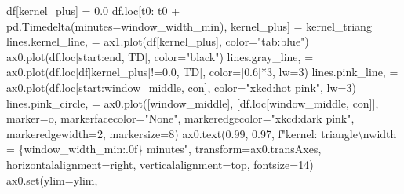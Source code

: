 \documentclass[
  letterpaper,
  DIV=11,
  numbers=noendperiod,
  oneside]{scrreprt}
\newenvironment{Shaded}{\begin{snugshade}}{\end{snugshade}}
\newcommand{\BuiltInTok}[1]{\textcolor[rgb]{0.00,0.23,0.31}{#1}}
\newcommand{\CharTok}[1]{\textcolor[rgb]{0.13,0.47,0.30}{#1}}
\newcommand{\DecValTok}[1]{\textcolor[rgb]{0.68,0.00,0.00}{#1}}
\newcommand{\FloatTok}[1]{\textcolor[rgb]{0.68,0.00,0.00}{#1}}
\newcommand{\NormalTok}[1]{\textcolor[rgb]{0.00,0.23,0.31}{#1}}
\newcommand{\OperatorTok}[1]{\textcolor[rgb]{0.37,0.37,0.37}{#1}}
\newcommand{\SpecialCharTok}[1]{\textcolor[rgb]{0.37,0.37,0.37}{#1}}
\newcommand{\SpecialStringTok}[1]{\textcolor[rgb]{0.13,0.47,0.30}{#1}}
\newcommand{\StringTok}[1]{\textcolor[rgb]{0.13,0.47,0.30}{#1}}
\begin{document}
\begin{Shaded}
\begin{Highlighting}[]
\NormalTok{df[}\StringTok{\textquotesingle{}kernel\_plus\textquotesingle{}}\NormalTok{] }\OperatorTok{=} \FloatTok{0.0}
\NormalTok{df.loc[t0: t0 }\OperatorTok{+}\NormalTok{ pd.Timedelta(minutes}\OperatorTok{=}\NormalTok{window\_width\_min), }\StringTok{\textquotesingle{}kernel\_plus\textquotesingle{}}\NormalTok{] }\OperatorTok{=}\NormalTok{ kernel\_triang}
\NormalTok{lines.kernel\_line, }\OperatorTok{=}\NormalTok{ ax1.plot(df[}\StringTok{\textquotesingle{}kernel\_plus\textquotesingle{}}\NormalTok{], color}\OperatorTok{=}\StringTok{"tab:blue"}\NormalTok{)}
\NormalTok{ax0.plot(df.loc[start:end, }\StringTok{\textquotesingle{}TD\textquotesingle{}}\NormalTok{], color}\OperatorTok{=}\StringTok{"black"}\NormalTok{)}
\NormalTok{lines.gray\_line, }\OperatorTok{=}\NormalTok{ ax0.plot(df.loc[df[}\StringTok{\textquotesingle{}kernel\_plus\textquotesingle{}}\NormalTok{]}\OperatorTok{!=}\FloatTok{0.0}\NormalTok{, }\StringTok{\textquotesingle{}TD\textquotesingle{}}\NormalTok{],}
\NormalTok{                     color}\OperatorTok{=}\NormalTok{[}\FloatTok{0.6}\NormalTok{]}\OperatorTok{*}\DecValTok{3}\NormalTok{, lw}\OperatorTok{=}\DecValTok{3}\NormalTok{)}
\NormalTok{lines.pink\_line, }\OperatorTok{=}\NormalTok{ ax0.plot(df.loc[start:window\_middle, }\StringTok{\textquotesingle{}con\textquotesingle{}}\NormalTok{], color}\OperatorTok{=}\StringTok{"xkcd:hot pink"}\NormalTok{, lw}\OperatorTok{=}\DecValTok{3}\NormalTok{)}
\NormalTok{lines.pink\_circle, }\OperatorTok{=}\NormalTok{ ax0.plot([window\_middle], [df.loc[window\_middle, }\StringTok{\textquotesingle{}con\textquotesingle{}}\NormalTok{]],}
\NormalTok{         marker}\OperatorTok{=}\StringTok{\textquotesingle{}o\textquotesingle{}}\NormalTok{, markerfacecolor}\OperatorTok{=}\StringTok{"None"}\NormalTok{, markeredgecolor}\OperatorTok{=}\StringTok{"xkcd:dark pink"}\NormalTok{, markeredgewidth}\OperatorTok{=}\DecValTok{2}\NormalTok{,}
\NormalTok{         markersize}\OperatorTok{=}\DecValTok{8}\NormalTok{)}
\NormalTok{ax0.text(}\FloatTok{0.99}\NormalTok{, }\FloatTok{0.97}\NormalTok{, }\SpecialStringTok{f"kernel: triangle}\CharTok{\textbackslash{}n}\SpecialStringTok{width = }\SpecialCharTok{\{}\NormalTok{window\_width\_min}\SpecialCharTok{:.0f\}}\SpecialStringTok{ minutes"}\NormalTok{, transform}\OperatorTok{=}\NormalTok{ax0.transAxes,}
\NormalTok{         horizontalalignment}\OperatorTok{=}\StringTok{\textquotesingle{}right\textquotesingle{}}\NormalTok{, verticalalignment}\OperatorTok{=}\StringTok{\textquotesingle{}top\textquotesingle{}}\NormalTok{,}
\NormalTok{         fontsize}\OperatorTok{=}\DecValTok{14}\NormalTok{)}
\NormalTok{ax0.}\BuiltInTok{set}\NormalTok{(ylim}\OperatorTok{=}\NormalTok{ylim,}

\end{Highlighting}
\end{Shaded}
\end{document}
